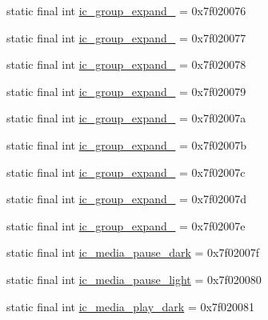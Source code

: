 \begin{CompactItemize}
\item 
static final int \hyperlink{classandroid_1_1support_1_1graphics_1_1drawable_1_1_r_1_1drawable_6aded7b325293966c9b556f5dbd52eaf}{ic\_\-group\_\-expand\_} = 0x7f020076
\item 
static final int \hyperlink{classandroid_1_1support_1_1graphics_1_1drawable_1_1_r_1_1drawable_52b1738ac93258761e7dc7c7759e14e9}{ic\_\-group\_\-expand\_} = 0x7f020077
\item 
static final int \hyperlink{classandroid_1_1support_1_1graphics_1_1drawable_1_1_r_1_1drawable_66997d641f894e8f037002c4a734d226}{ic\_\-group\_\-expand\_} = 0x7f020078
\item 
static final int \hyperlink{classandroid_1_1support_1_1graphics_1_1drawable_1_1_r_1_1drawable_beab17cbfa28996c12fadb5792e50150}{ic\_\-group\_\-expand\_} = 0x7f020079
\item 
static final int \hyperlink{classandroid_1_1support_1_1graphics_1_1drawable_1_1_r_1_1drawable_f28da37e646786243bdec58cedd3c490}{ic\_\-group\_\-expand\_} = 0x7f02007a
\item 
static final int \hyperlink{classandroid_1_1support_1_1graphics_1_1drawable_1_1_r_1_1drawable_f860c261741627770b26a4e3771c0fe5}{ic\_\-group\_\-expand\_} = 0x7f02007b
\item 
static final int \hyperlink{classandroid_1_1support_1_1graphics_1_1drawable_1_1_r_1_1drawable_df01f49ecf70d37c6299317432d1d2f4}{ic\_\-group\_\-expand\_} = 0x7f02007c
\item 
static final int \hyperlink{classandroid_1_1support_1_1graphics_1_1drawable_1_1_r_1_1drawable_6dfd175f74c588167ce3755e4ab77eaa}{ic\_\-group\_\-expand\_} = 0x7f02007d
\item 
static final int \hyperlink{classandroid_1_1support_1_1graphics_1_1drawable_1_1_r_1_1drawable_1154abea858aa3b302f5a7ff88a4aeb9}{ic\_\-group\_\-expand\_} = 0x7f02007e
\item 
static final int \hyperlink{classandroid_1_1support_1_1graphics_1_1drawable_1_1_r_1_1drawable_fbc76d56104711194c0cf1d1f252fb5f}{ic\_\-media\_\-pause\_\-dark} = 0x7f02007f
\item 
static final int \hyperlink{classandroid_1_1support_1_1graphics_1_1drawable_1_1_r_1_1drawable_229be78ce79773d963982fa7c090754e}{ic\_\-media\_\-pause\_\-light} = 0x7f020080
\item 
static final int \hyperlink{classandroid_1_1support_1_1graphics_1_1drawable_1_1_r_1_1drawable_24117696c9c7024de49849247dccf1ea}{ic\_\-media\_\-play\_\-dark} = 0x7f020081

\end{CompactItemize}
